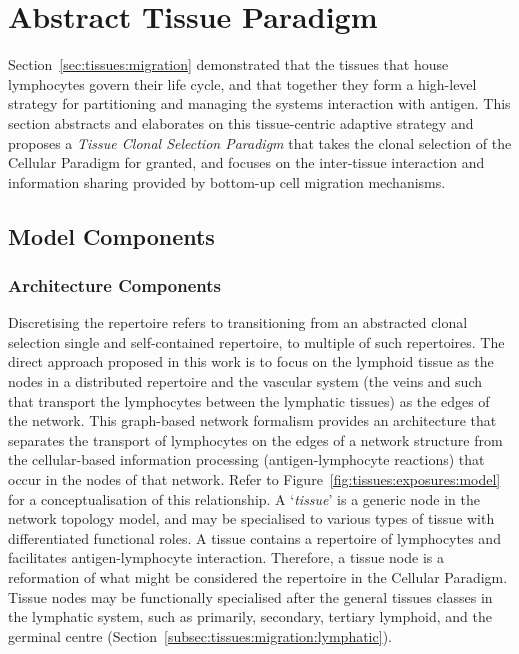 %
%
\section{Abstract Tissue Paradigm}
\label{sec:tissues:paradigm}
Section~\ref{sec:tissues:migration} demonstrated that the tissues that house lymphocytes govern their life cycle, and that together they form a high-level strategy for partitioning and managing the systems interaction with antigen. This section abstracts and elaborates on this tissue-centric adaptive strategy and proposes a \emph{Tissue Clonal Selection Paradigm} that takes the clonal selection of the Cellular Paradigm for granted, and focuses on the inter-tissue interaction and information sharing provided by bottom-up cell migration mechanisms. 
 
%
%
\subsection{Model Components}
\label{subsec:tissues:paradigm:models}


%
%
\subsubsection{Architecture Components}
\label{subsec:tissues:paradigm:models:architecture}
Discretising the repertoire refers to transitioning from an abstracted clonal selection single and self-contained repertoire, to multiple of such repertoires. The direct approach proposed in this work is to focus on the lymphoid tissue as the nodes in a distributed repertoire and the vascular system (the veins and such that transport the lymphocytes between the lymphatic tissues) as the edges of the network. This graph-based network formalism provides an architecture that separates the transport of lymphocytes on the edges of a network structure from the cellular-based information processing (antigen-lymphocyte reactions) that occur in the nodes of that network. Refer to Figure~\ref{fig:tissues:exposures:model} for a conceptualisation of this relationship.
A `\emph{tissue}' is a generic node in the network topology model, and may be specialised to various types of tissue with differentiated functional roles. A tissue contains a repertoire of lymphocytes and facilitates antigen-lymphocyte interaction. Therefore, a tissue node is a reformation of what might be considered the repertoire in the Cellular Paradigm. Tissue nodes may be functionally specialised after the general tissues classes in the lymphatic system, such as primarily, secondary, tertiary lymphoid, and the germinal centre (Section~\ref{subsec:tissues:migration:lymphatic}).

